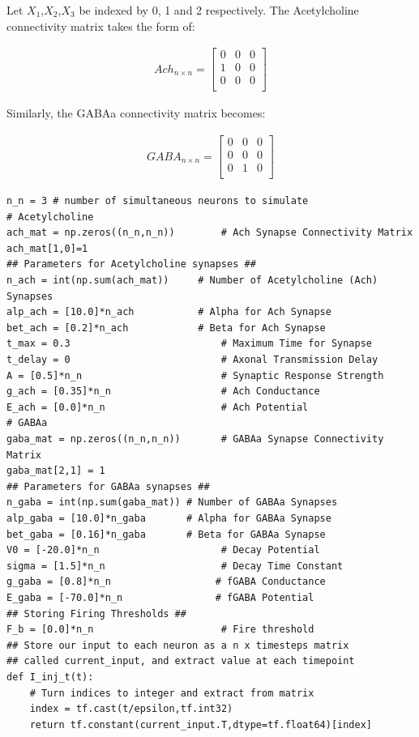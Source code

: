 \documentclass[10pt,letterpaper]{article}
\begin{document}
Let $X_1$,$X_2$,$X_3$ be indexed by 0, 1 and 2 respectively. The Acetylcholine connectivity matrix takes the form of:

\begin{eqnarray}
Ach_{n\times n}=
\begin{bmatrix}
0&0&0\\
1&0&0\\
0&0&0\\
\end{bmatrix}
\end{eqnarray}

Similarly, the GABAa connectivity matrix becomes:

\begin{eqnarray}
GABA_{n\times n}=
\begin{bmatrix}
0&0&0\\
0&0&0\\
0&1&0\\
\end{bmatrix}
\end{eqnarray}

\begin{verbatim}
n_n = 3 # number of simultaneous neurons to simulate
# Acetylcholine
ach_mat = np.zeros((n_n,n_n))        # Ach Synapse Connectivity Matrix
ach_mat[1,0]=1
## Parameters for Acetylcholine synapses ##
n_ach = int(np.sum(ach_mat))     # Number of Acetylcholine (Ach) Synapses 
alp_ach = [10.0]*n_ach           # Alpha for Ach Synapse
bet_ach = [0.2]*n_ach            # Beta for Ach Synapse
t_max = 0.3                          # Maximum Time for Synapse
t_delay = 0                          # Axonal Transmission Delay
A = [0.5]*n_n                        # Synaptic Response Strength
g_ach = [0.35]*n_n                   # Ach Conductance
E_ach = [0.0]*n_n                    # Ach Potential
# GABAa
gaba_mat = np.zeros((n_n,n_n))       # GABAa Synapse Connectivity Matrix
gaba_mat[2,1] = 1
## Parameters for GABAa synapses ##
n_gaba = int(np.sum(gaba_mat)) # Number of GABAa Synapses
alp_gaba = [10.0]*n_gaba       # Alpha for GABAa Synapse
bet_gaba = [0.16]*n_gaba       # Beta for GABAa Synapse
V0 = [-20.0]*n_n                     # Decay Potential
sigma = [1.5]*n_n                    # Decay Time Constant
g_gaba = [0.8]*n_n                  # fGABA Conductance
E_gaba = [-70.0]*n_n                # fGABA Potential
## Storing Firing Thresholds ##
F_b = [0.0]*n_n                      # Fire threshold
## Store our input to each neuron as a n x timesteps matrix
## called current_input, and extract value at each timepoint
def I_inj_t(t):
    # Turn indices to integer and extract from matrix
    index = tf.cast(t/epsilon,tf.int32)
    return tf.constant(current_input.T,dtype=tf.float64)[index] 
\end{verbatim}
\end{document}
